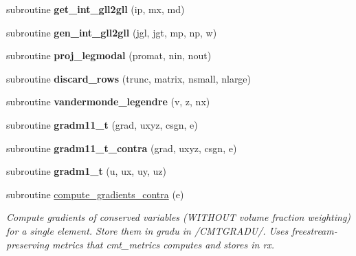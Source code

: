 \begin{DoxyCompactItemize}
\item 
\hypertarget{intpdiff_8f_adbe1ea1506fd5b21cfd8cab10fe0dbc1}{subroutine {\bfseries get\-\_\-int\-\_\-gll2gll} (ip, mx, md)}\label{intpdiff_8f_adbe1ea1506fd5b21cfd8cab10fe0dbc1}

\item 
\hypertarget{intpdiff_8f_a5d574fca7f7d37eff7a8d4403234b933}{subroutine {\bfseries gen\-\_\-int\-\_\-gll2gll} (jgl, jgt, mp, np, w)}\label{intpdiff_8f_a5d574fca7f7d37eff7a8d4403234b933}

\item 
\hypertarget{intpdiff_8f_a6f38dc1f5c137244ae1e261f5bd8279d}{subroutine {\bfseries proj\-\_\-legmodal} (promat, nin, nout)}\label{intpdiff_8f_a6f38dc1f5c137244ae1e261f5bd8279d}

\item 
\hypertarget{intpdiff_8f_acf24494d8b1303f196d15df7ee49f3ec}{subroutine {\bfseries discard\-\_\-rows} (trunc, matrix, nsmall, nlarge)}\label{intpdiff_8f_acf24494d8b1303f196d15df7ee49f3ec}

\item 
\hypertarget{intpdiff_8f_a2fb7b91baaeb2779459b988214efeb9e}{subroutine {\bfseries vandermonde\-\_\-legendre} (v, z, nx)}\label{intpdiff_8f_a2fb7b91baaeb2779459b988214efeb9e}

\item 
\hypertarget{intpdiff_8f_a8f6017ff4e0e2f0d51ed4e1ab69b4f4d}{subroutine {\bfseries gradm11\-\_\-t} (grad, uxyz, csgn, e)}\label{intpdiff_8f_a8f6017ff4e0e2f0d51ed4e1ab69b4f4d}

\item 
\hypertarget{intpdiff_8f_ad76b847e0448d4a237eca9f4f316ebac}{subroutine {\bfseries gradm11\-\_\-t\-\_\-contra} (grad, uxyz, csgn, e)}\label{intpdiff_8f_ad76b847e0448d4a237eca9f4f316ebac}

\item 
\hypertarget{intpdiff_8f_a0d378518f250568824942e9d861a008e}{subroutine {\bfseries gradm1\-\_\-t} (u, ux, uy, uz)}\label{intpdiff_8f_a0d378518f250568824942e9d861a008e}

\end{DoxyCompactItemize}
{\bf }\par
\begin{DoxyCompactItemize}
\item 
subroutine \hyperlink{intpdiff_8f_a4bc9678542951a32332a86f8baf88f23}{compute\-\_\-gradients\-\_\-contra} (e)
\begin{DoxyCompactList}\small\item\em Compute gradients of conserved variables (W\-I\-T\-H\-O\-U\-T volume fraction weighting) for a single element. Store them in gradu in /\-C\-M\-T\-G\-R\-A\-D\-U/. Uses freestream-\/preserving metrics that cmt\-\_\-metrics computes and stores in rx. \end{DoxyCompactList}\end{DoxyCompactItemize}

